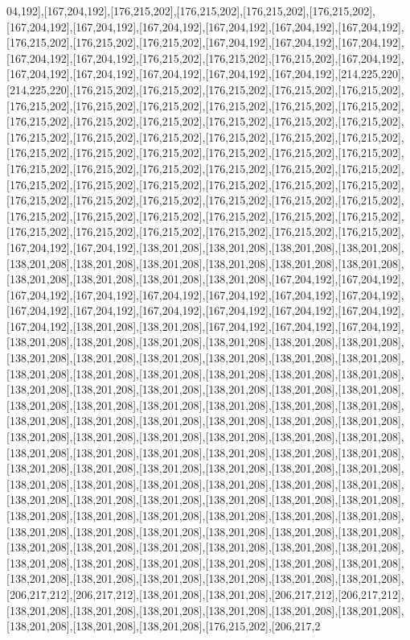 04,192],[167,204,192],[176,215,202],[176,215,202],[176,215,202],[176,215,202],[167,204,192],[167,204,192],[167,204,192],[167,204,192],[167,204,192],[167,204,192],[176,215,202],[176,215,202],[176,215,202],[167,204,192],[167,204,192],[167,204,192],[167,204,192],[167,204,192],[176,215,202],[176,215,202],[176,215,202],[167,204,192],[167,204,192],[167,204,192],[167,204,192],[167,204,192],[167,204,192],[214,225,220],[214,225,220],[176,215,202],[176,215,202],[176,215,202],[176,215,202],[176,215,202],[176,215,202],[176,215,202],[176,215,202],[176,215,202],[176,215,202],[176,215,202],[176,215,202],[176,215,202],[176,215,202],[176,215,202],[176,215,202],[176,215,202],[176,215,202],[176,215,202],[176,215,202],[176,215,202],[176,215,202],[176,215,202],[176,215,202],[176,215,202],[176,215,202],[176,215,202],[176,215,202],[176,215,202],[176,215,202],[176,215,202],[176,215,202],[176,215,202],[176,215,202],[176,215,202],[176,215,202],[176,215,202],[176,215,202],[176,215,202],[176,215,202],[176,215,202],[176,215,202],[176,215,202],[176,215,202],[176,215,202],[176,215,202],[176,215,202],[176,215,202],[176,215,202],[176,215,202],[176,215,202],[176,215,202],[176,215,202],[176,215,202],[176,215,202],[176,215,202],[176,215,202],[176,215,202],[176,215,202],[167,204,192],[167,204,192],[138,201,208],[138,201,208],[138,201,208],[138,201,208],[138,201,208],[138,201,208],[138,201,208],[138,201,208],[138,201,208],[138,201,208],[138,201,208],[138,201,208],[138,201,208],[138,201,208],[167,204,192],[167,204,192],[167,204,192],[167,204,192],[167,204,192],[167,204,192],[167,204,192],[167,204,192],[167,204,192],[167,204,192],[167,204,192],[167,204,192],[167,204,192],[167,204,192],[167,204,192],[138,201,208],[138,201,208],[167,204,192],[167,204,192],[167,204,192],[138,201,208],[138,201,208],[138,201,208],[138,201,208],[138,201,208],[138,201,208],[138,201,208],[138,201,208],[138,201,208],[138,201,208],[138,201,208],[138,201,208],[138,201,208],[138,201,208],[138,201,208],[138,201,208],[138,201,208],[138,201,208],[138,201,208],[138,201,208],[138,201,208],[138,201,208],[138,201,208],[138,201,208],[138,201,208],[138,201,208],[138,201,208],[138,201,208],[138,201,208],[138,201,208],[138,201,208],[138,201,208],[138,201,208],[138,201,208],[138,201,208],[138,201,208],[138,201,208],[138,201,208],[138,201,208],[138,201,208],[138,201,208],[138,201,208],[138,201,208],[138,201,208],[138,201,208],[138,201,208],[138,201,208],[138,201,208],[138,201,208],[138,201,208],[138,201,208],[138,201,208],[138,201,208],[138,201,208],[138,201,208],[138,201,208],[138,201,208],[138,201,208],[138,201,208],[138,201,208],[138,201,208],[138,201,208],[138,201,208],[138,201,208],[138,201,208],[138,201,208],[138,201,208],[138,201,208],[138,201,208],[138,201,208],[138,201,208],[138,201,208],[138,201,208],[138,201,208],[138,201,208],[138,201,208],[138,201,208],[138,201,208],[138,201,208],[138,201,208],[138,201,208],[138,201,208],[138,201,208],[138,201,208],[138,201,208],[138,201,208],[138,201,208],[138,201,208],[138,201,208],[138,201,208],[138,201,208],[138,201,208],[138,201,208],[138,201,208],[138,201,208],[138,201,208],[206,217,212],[206,217,212],[138,201,208],[138,201,208],[206,217,212],[206,217,212],[138,201,208],[138,201,208],[138,201,208],[138,201,208],[138,201,208],[138,201,208],[138,201,208],[138,201,208],[138,201,208],[176,215,202],[206,217,2